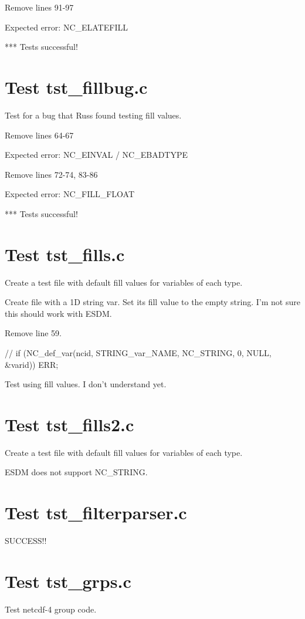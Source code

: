 Remove lines 91-97

Expected error: NC\_ELATEFILL

*** Tests successful!

\section{Test tst\_fillbug.c}

Test for a bug that Russ found testing fill values.

Remove lines 64-67

Expected error: NC\_EINVAL / NC\_EBADTYPE

Remove lines 72-74, 83-86

Expected error: NC\_FILL\_FLOAT

*** Tests successful!

\section{Test tst\_fills.c}

Create a test file with default fill values for variables of each
   type.

Create file with a 1D string var. Set its fill value to the empty string.
I'm not sure this should work with ESDM.

Remove line 59.

// if (NC\_def\_var(ncid, STRING\_var\_NAME, NC\_STRING, 0, NULL, \&varid)) ERR;

Test using fill values. I don't understand yet.

\section{Test tst\_fills2.c}

Create a test file with default fill values for variables of each type.

ESDM does not support NC\_STRING.

\section{Test tst\_filterparser.c}

SUCCESS!!

\section{Test tst\_grps.c}

Test netcdf-4 group code.

